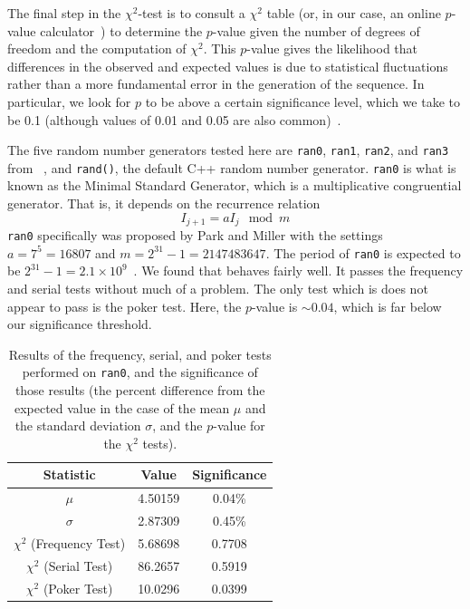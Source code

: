 \documentclass[12pt]{article}
\numberwithin{equation}{section}
\begin{document}
\par The final step in the $\chi^{2}$-test is to consult a $\chi^{2}$ table (or, in our case, an online $p$-value calculator~\cite{graphpad}) to determine the $p$-value given the number of degrees of freedom and the computation of $\chi^{2}$.  This $p$-value gives the likelihood that differences in the observed and expected values is due to statistical fluctuations rather than a more fundamental error in the generation of the sequence.  In particular, we look for $p$ to be above a certain significance level, which we take to be 0.1 (although values of 0.01 and 0.05 are also common)~\cite{drueke}.
\par The five random number generators tested here are \texttt{ran0}, \texttt{ran1}, \texttt{ran2}, and \texttt{ran3} from ~\cite{recipes}, and \texttt{rand()}, the default C++ random number generator.  \texttt{ran0} is what is known as the Minimal Standard Generator, which is a multiplicative congruential generator.  That is, it depends on the recurrence relation
\begin{equation}
\label{eq:ran0recur}
I_{j+1}=aI_{j}\mod m
\end{equation}
\texttt{ran0} specifically was proposed by Park and Miller with the settings $a=7^{5}=16807$ and $m=2^{31}-1=2147483647$.  The period of \texttt{ran0} is expected to be $2^{31}-1=2.1\times10^{9}$~.  We found that  behaves fairly well.  It passes the frequency and serial tests without much of a problem.  The only test which is does not appear to pass is the poker test.  Here, the $p$-value is $\sim0.04$, which is far below our significance threshold.  

\begin{table}[ht]
\begin{center}
\begin{tabular}{c|c|c} \hline
Statistic & Value & Significance\\\hline
$\mu$ & 4.50159 & 0.04\% \\
$\sigma$ & 2.87309 & 0.45\%\\
$\chi^{2}$ (Frequency Test) & 5.68698 & 0.7708 \\
$\chi^{2}$ (Serial Test) & 86.2657 & 0.5919 \\
$\chi^{2}$ (Poker Test) & 10.0296 & 0.0399 \\ \hline
\end{tabular}
\caption{Results of the frequency, serial, and poker tests performed on \texttt{ran0}, and the significance of those results (the percent difference from the expected value in the case of the mean $\mu$ and the standard deviation $\sigma$, and the $p$-value for the $\chi^{2}$ tests).}
\label{tab:ran0results}
\end{center}
\end{table}
\end{document}
